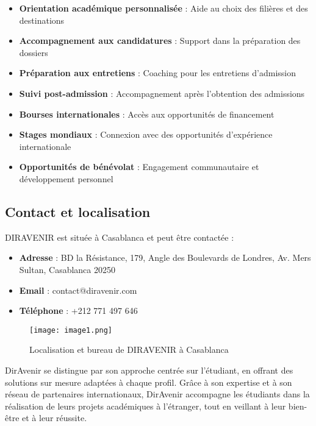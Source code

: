 \documentclass[12pt,a4paper]{report}
\begin{document}
\begin{itemize}
    \item \textbf{Orientation académique personnalisée} : Aide au choix des filières et des destinations
    \item \textbf{Accompagnement aux candidatures} : Support dans la préparation des dossiers
    \item \textbf{Préparation aux entretiens} : Coaching pour les entretiens d'admission
    \item \textbf{Suivi post-admission} : Accompagnement après l'obtention des admissions
    \item \textbf{Bourses internationales} : Accès aux opportunités de financement
    \item \textbf{Stages mondiaux} : Connexion avec des opportunités d'expérience internationale
    \item \textbf{Opportunités de bénévolat} : Engagement communautaire et développement personnel
\end{itemize}

\subsection{Contact et localisation}

DIRAVENIR est située à Casablanca et peut être contactée :

\begin{itemize}
    \item \textbf{Adresse} : BD la Résistance, 179, Angle des Boulevards de Londres, Av. Mers Sultan, Casablanca 20250
    \item \textbf{Email} : contact@diravenir.com
    \item \textbf{Téléphone} : +212 771 497 646
\end{itemize}

\begin{figure}[H]
\centering
\texttt{[image: image1.png]}
\caption{Localisation et bureau de DIRAVENIR à Casablanca}
\label{fig:localisation-diravenir}
\end{figure}


DirAvenir se distingue par son approche centrée sur l'étudiant, en offrant des solutions sur mesure adaptées à chaque profil. Grâce à son expertise et à son réseau de partenaires internationaux, DirAvenir accompagne les étudiants dans la réalisation de leurs projets académiques à l'étranger, tout en veillant à leur bien-être et à leur réussite.
\end{document}
